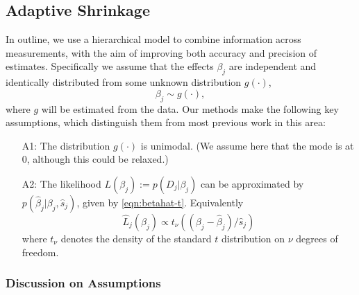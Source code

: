 \documentclass[11pt]{article}
\def\bhat{\hat{\beta}}
\def\shat{\hat{s}}
\begin{document}
 \subsection*{Adaptive Shrinkage}
 
 
 
 In outline, we use a hierarchical model to combine information across measurements, with the aim of improving both accuracy and precision of estimates. 
 Specifically we assume that the effects $\beta_j$ are independent and identically distributed from some unknown distribution $g(\cdot)$,
 \begin{equation} \label{eqn:beta}
 \beta_j \sim g(\cdot),
 \end{equation}
 where $g$ will be estimated from
 the data.  Our methods make the following key assumptions, which distinguish them from most previous work in this area:
   \begin{enumerate}
  \item[A1:] The distribution $g(\cdot)$ is unimodal. (We assume here that the mode is at 0, although 
this could be relaxed.)  
 \item[A2:] The likelihood $L(\beta_j) := p(D_j | \beta_j)$ can be approximated by $p(\bhat_j | \beta_j, \shat_j)$, given by \ref{eqn:betahat-t}.
Equivalently
  \begin{equation} \label{eqn:lik}
 \hat{L}_j(\beta_j) \propto t_\nu((\beta_j-\bhat_j)/\shat_j)
 \end{equation}
 where $t_\nu$ denotes the density of the standard $t$ distribution on $\nu$ degrees of freedom.
 \end{enumerate}
 
 \subsubsection*{Discussion on Assumptions}
 
\end{document}
